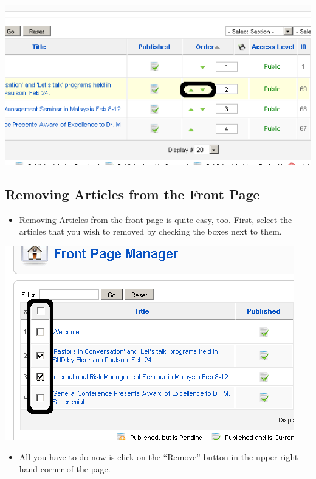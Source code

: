 \documentclass[letterpaper,10pt,english]{manual}
\begin{document}
{\hfill\includegraphics{articleFrontPageOrdering1.png}\hfill}

\subsection{Removing Articles from the Front Page}
\begin{itemize}
\item {} 
Removing Articles from the front page is quite easy, too.  First, select the articles that you wish to removed by checking the boxes next to them.

\end{itemize}

{\hfill\includegraphics{articleFrontPageSelectArticles1.png}\hfill}
\begin{itemize}
\item {} 
All you have to do now is click on the “Remove” button in the upper right hand corner of the page.

\end{itemize}
\end{document}
